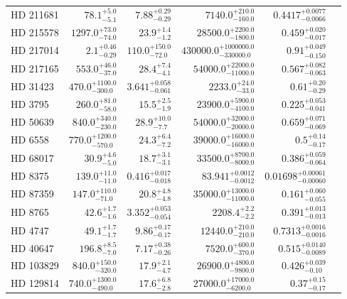 \begin{longtable*}{lrrrrr}
HD 211681 & $78.1^{+5.0}_{-5.1}$ & $7.88^{+0.29}_{-0.29}$ & $7140.0^{+210.0}_{-160.0}$ & $0.4417^{+0.0077}_{-0.0066}$ \\ 
HD 215578 & $1297.0^{+73.0}_{-74.0}$ & $23.9^{+1.4}_{-1.2}$ & $28500.0^{+2200.0}_{-1800.0}$ & $0.459^{+0.020}_{-0.017}$ \\ 
HD 217014 & $2.1^{+0.46}_{-0.29}$ & $110.0^{+150.0}_{-72.0}$ & $430000.0^{+1000000.0}_{-330000.0}$ & $0.91^{+0.049}_{-0.150}$ \\ 
HD 217165 & $553.0^{+46.0}_{-37.0}$ & $28.4^{+7.4}_{-4.1}$ & $54000.0^{+22000.0}_{-11000.0}$ & $0.567^{+0.082}_{-0.063}$ \\ 
HD 31423 & $470.0^{+1100.0}_{-300.0}$ & $3.641^{+0.058}_{-0.061}$ & $2233.0^{+24.0}_{-33.0}$ & $0.61^{+0.20}_{-0.29}$ \\ 
HD 3795 & $260.0^{+81.0}_{-58.0}$ & $15.5^{+2.5}_{-1.9}$ & $23900.0^{+5900.0}_{-4100.0}$ & $0.225^{+0.053}_{-0.041}$ \\ 
HD 50639 & $840.0^{+340.0}_{-230.0}$ & $28.9^{+10.0}_{-7.7}$ & $54000.0^{+32000.0}_{-20000.0}$ & $0.659^{+0.071}_{-0.069}$ \\ 
HD 6558 & $770.0^{+1200.0}_{-570.0}$ & $24.3^{+6.4}_{-7.2}$ & $39000.0^{+16000.0}_{-16000.0}$ & $0.5^{+0.14}_{-0.17}$ \\ 
HD 68017 & $30.9^{+4.6}_{-5.0}$ & $18.7^{+3.1}_{-3.1}$ & $33500.0^{+8700.0}_{-8000.0}$ & $0.386^{+0.059}_{-0.064}$ \\ 
HD 8375 & $139.0^{+11.0}_{-11.0}$ & $0.416^{+0.017}_{-0.018}$ & $83.941^{+0.0012}_{-0.0012}$ & $0.01698^{+0.00061}_{-0.00060}$ \\ 
HD 87359 & $147.0^{+110.0}_{-71.0}$ & $20.8^{+4.8}_{-4.8}$ & $35000.0^{+13000.0}_{-11000.0}$ & $0.161^{+0.060}_{-0.055}$ \\ 
HD 8765 & $42.6^{+1.7}_{-1.6}$ & $3.352^{+0.053}_{-0.054}$ & $2208.4^{+2.2}_{-2.2}$ & $0.391^{+0.013}_{-0.013}$ \\ 
HD 4747 & $49.1^{+1.7}_{-1.7}$ & $9.86^{+0.17}_{-0.17}$ & $12440.0^{+210.0}_{-210.0}$ & $0.7313^{+0.0016}_{-0.0016}$ \\ 
HD 40647 & $196.8^{+8.5}_{-7.0}$ & $7.17^{+0.38}_{-0.26}$ & $7520.0^{+600.0}_{-370.0}$ & $0.515^{+0.0140}_{-0.0089}$ \\ 
HD 103829 & $840.0^{+150.0}_{-320.0}$ & $17.9^{+2.1}_{-4.7}$ & $26900.0^{+4800.0}_{-9800.0}$ & $0.426^{+0.039}_{-0.10}$ \\ 
HD 129814 & $740.0^{+1300.0}_{-490.0}$ & $17.6^{+6.8}_{-2.8}$ & $27000.0^{+17000.0}_{-6200.0}$ & $0.37^{+0.15}_{-0.17}$ \\ 

\end{longtable*}
